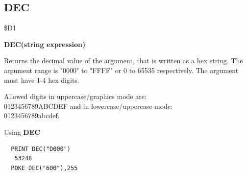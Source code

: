 \subsection{DEC}
\begin{description}[leftmargin=2cm,style=nextline]
\item [Token:] \$D1
\item [Format:] {\bf DEC(string expression)}
\item [Usage:] Returns the decimal value
               of the argument, that is written as a hex string.
               The argument range is "0000" to "FFFF" or
               0 to 65535 respectively.
               The argument must have 1-4 hex digits.

\item [Remarks:] Allowed digits in uppercase/graphics mode are: \\
                 0123456789ABCDEF and in lowercase/uppercase mode: \\
                 0123456789abcdef.

\item [Example:] Using {\bf DEC}
\begin{tcolorbox}[colback=black,coltext=white]
\verbatimfont{\codefont}
\begin{verbatim}
  PRINT DEC("D000")
   53248
  POKE DEC("600"),255
\end{verbatim}
\end{tcolorbox}
\end{description}


\newpage
